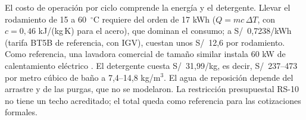 El costo de operación por ciclo comprende la energía y el detergente. Llevar el rodamiento de 15 a 60~$^\circ$C requiere del orden de 17 kWh ($Q=mc\,\Delta T$, con $c=0{,}46$ kJ/(kg\,K) para el acero), que dominan el consumo; a S/~0,7238/kWh (tarifa BT5B de referencia, con IGV), cuestan unos S/~12,6 por rodamiento. Como referencia, una lavadora comercial de tamaño similar instala 60 kW de calentamiento eléctrico \cite{stingray_6075}. El detergente cuesta S/~31,99/kg, es decir, S/~237--473 por metro cúbico de baño a 7,4--14,8 kg/m$^3$. El agua de reposición depende del arrastre y de las purgas, que no se modelaron. La restricción presupuestal RS-10 no tiene un techo acreditado; el total queda como referencia para las cotizaciones formales.
